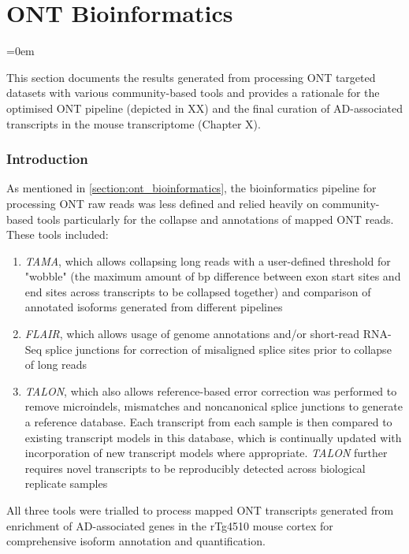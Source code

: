 \chapter{ONT Bioinformatics}\label{app_ONTBioinformatics}
\label{ONT_Bioinformatics_appendix}

\begingroup
\parindent=0em
\localtableofcontents 
\endgroup

This section documents the results generated from processing ONT targeted datasets with various community-based tools and provides a rationale for the optimised ONT pipeline (depicted in XX) and the final curation of AD-associated transcripts in the mouse transcriptome (Chapter X). 

\subsection{Introduction}
As mentioned in \cref{section:ont_bioinformatics}, the bioinformatics pipeline for processing ONT raw reads was less defined and relied heavily on community-based tools particularly for the collapse and annotations of mapped ONT reads. These tools included:
\begin{enumerate}
	\item \textit{TAMA}, which allows collapsing long reads with a user-defined threshold for "wobble" (the maximum amount of bp difference between exon start sites and end sites across transcripts to be collapsed together) and comparison of annotated isoforms generated from different pipelines
	\item \textit{FLAIR}, which allows usage of genome annotations and/or short-read RNA-Seq splice junctions for correction of misaligned splice sites prior to collapse of long reads  
	\item \textit{TALON}, which also allows reference-based error correction was performed to remove microindels, mismatches and noncanonical splice junctions to generate a reference database. Each transcript from each sample is then compared to existing transcript models in this database, which is continually updated with incorporation of new transcript models where appropriate. \textit{TALON} further requires novel transcripts to be reproducibly detected across biological replicate samples 
\end{enumerate}
All three tools were trialled to process mapped ONT transcripts generated from enrichment of AD-associated genes in the rTg4510 mouse cortex for comprehensive isoform annotation and quantification. 

